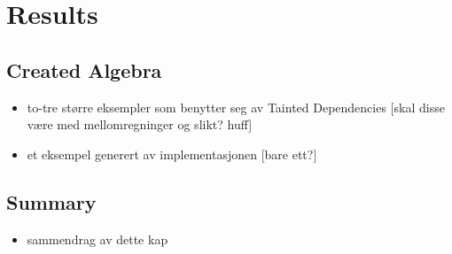 \chapter{Results}
\label{chapter:results}
\section{Created Algebra}
\begin{itemize}
  \item to-tre større eksempler som benytter seg av Tainted Dependencies [skal
  disse v\ae re med mellomregninger og slikt? huff]
  \item et eksempel generert av implementasjonen [bare ett?]
\end{itemize}



\section{Summary}
\label{sect:res:summary}
\begin{itemize}
  \item sammendrag av dette kap
\end{itemize}
